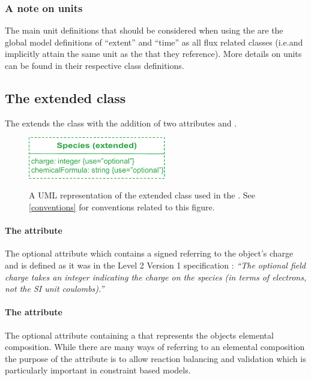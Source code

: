 \subsubsection{A note on units}
\label{fbcunits}
The main unit definitions that should be considered when using the \FBCPackage are the global model definitions of ``extent''  and ``time'' as all \FBC flux related classes (i.e.\FluxBound and \FluxObjective implicitly attain the same unit as the \Reaction that they reference). More details on units can be found in their respective class definitions.

\subsection{The extended  class}
\label{species-class}

The \FBCPackage extends the \sbmlthreecore \Species class with the addition
of two attributes  and .
%
\begin{figure}[h]
  \centering
  \includegraphics[width=6cm]{images/fbc_uml_species.pdf}\\
  \caption{A UML representation of the extended \SBML \Species class used in
  the \FBCPackage. See \ref{conventions} for conventions related to this
  figure.}
  \label{fig:fbc_uml_species}
\end{figure}


\paragraph{The  attribute}
The optional attribute  which contains a signed
 referring to the \Species object's charge and is
defined as it was in the \SBML Level 2 Version 1 specification
: \textit{``The optional field charge takes an integer indicating
the charge on the species (in terms of electrons, not the SI unit coulombs).''}

\paragraph{The  attribute}
\label{chemicalFormula-attribute}
The optional attribute  containing a
 that represents the \Species objects elemental
composition.
%
%
While there are many ways of referring to an elemental composition the purpose of the  attribute is to allow reaction balancing and validation which is particularly important in constraint based models.

